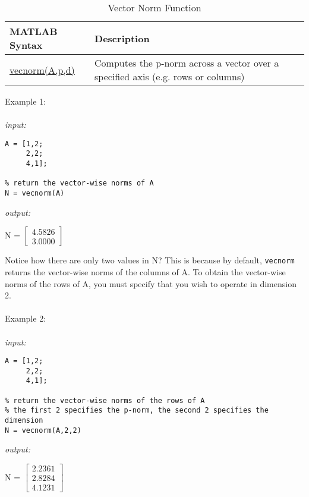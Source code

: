 \documentclass[../MATLAB_Primer.tex]{subfiles}
\begin{document}
\begin{table}[H]
\caption{Vector Norm Function}
    \begin{center}
        \begin{tabular}{| C{3cm} | m{12cm}|}
            \hline
            \textbf{MATLAB Syntax} & \textbf{Description}\\
            
            \hline
            \href{https://www.mathworks.com/help/matlab/ref/vecnorm.html}{\color{blue}vecnorm(A,p,d)} & Computes the p-norm across a vector over a specified axis (e.g. rows or columns)\\
            \hline
            
        \end{tabular}
        \label{tab:vector_norm}
    \end{center}
\end{table}

Example 1:
\\ \\
\textit{input:}
\begin{lstlisting}[frame=single]
% consider the matrix A
A = [1,2; 
     2,2;
     4,1];
    
% return the vector-wise norms of A 
N = vecnorm(A) 
\end{lstlisting}

\textit{output:}

\begin{center}
    N = 
    $\begin{bmatrix}
    4.5826\\
    3.0000
    \end{bmatrix}$
\end{center}

Notice how there are only two values in N? This is because by default, \texttt{vecnorm} returns the vector-wise norms of the columns of A. To obtain the vector-wise norms of the rows of A, you must specify that you wish to operate in dimension 2.
\\ \\
Example 2:
\\ \\
\textit{input:}
\begin{lstlisting}[frame=single]
% consider A to be 3 (x,y) pairs
A = [1,2; 
     2,2;
     4,1];
     
% return the vector-wise norms of the rows of A
% the first 2 specifies the p-norm, the second 2 specifies the dimension
N = vecnorm(A,2,2) 
\end{lstlisting}

\textit{output:}

\begin{center}
    N = 
    $\begin{bmatrix}
    2.2361\\
    2.8284\\
    4.1231
    \end{bmatrix}$
\end{center}
\end{document}

